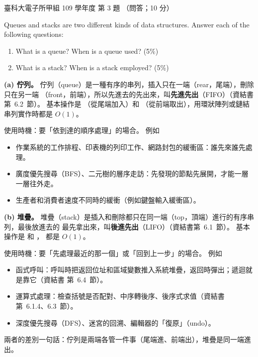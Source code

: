 \begin{pastexam}[label={px:ntust-109-et-ds-03}]{臺科大電子所甲組 109 學年度 第 3 題}
（問答；10 分）

Queues and stacks are two different kinds of data structures. Answer each of the following
questions:
\begin{enumerate}[label=(\alph*)]
\item What is a queue? When is a queue used? (5\%)
\item What is a stack? When is a stack employed? (5\%)
\end{enumerate}
\end{pastexam}

\begin{pastsoln}
\textbf{(a) 佇列。} 佇列（queue）是一種有序的串列，插入只在一端（rear，尾端），刪除只在另一端
（front，前端），所以先進去的先出來，叫\textbf{先進先出}（FIFO）（資結書第~6.2~節）。 基本操作是
（從尾端加入）和 （從前端取出），用環狀陣列或鏈結串列實作時都是
$O(1)$。

使用時機：要「依到達的順序處理」的場合。 例如
\begin{itemize}
\item 作業系統的工作排程、印表機的列印工作、網路封包的緩衝區：誰先來誰先處理。
\item 廣度優先搜尋（BFS）、二元樹的層序走訪：先發現的節點先展開，才能一層一層往外走。
\item 生產者和消費者速度不同時的緩衝（例如鍵盤輸入緩衝區）。
\end{itemize}

\textbf{(b) 堆疊。} 堆疊（stack）是插入和刪除都只在同一端（top，頂端）進行的有序串列，最後放進去的
最先拿出來，叫\textbf{後進先出}（LIFO）（資結書第~6.1~節）。 基本操作是  和 ，
都是 $O(1)$。

使用時機：要「先處理最近的那一個」或「回到上一步」的場合。 例如
\begin{itemize}
\item 函式呼叫：呼叫時把返回位址和區域變數推入系統堆疊，返回時彈出；遞迴就是靠它（資結書
第~6.4~節）。
\item 運算式處理：檢查括號是否配對、中序轉後序、後序式求值（資結書第~6.1.4、6.3~節）。
\item 深度優先搜尋（DFS）、迷宮的回溯、編輯器的「復原」（undo）。
\end{itemize}

兩者的差別一句話：佇列是兩端各管一件事（尾端進、前端出），堆疊是同一端進出。
\end{pastsoln}
